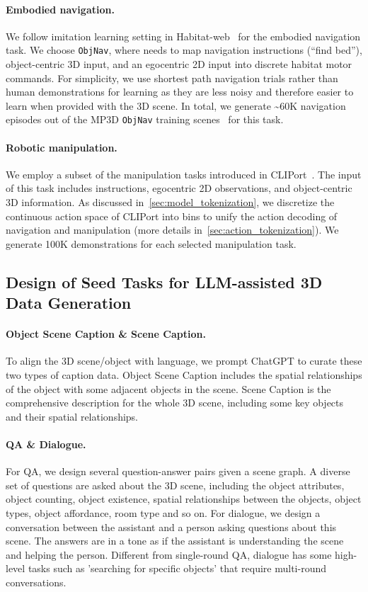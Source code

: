 \paragraph{Embodied navigation.} We follow imitation learning setting in Habitat-web~\citep{ramrakhya2022habitat} for the embodied navigation task. We choose \texttt{ObjNav}, where \agent needs to map navigation instructions (\eg ``find bed''), object-centric 3D input, and an egocentric 2D input into discrete habitat motor commands. For simplicity, we use shortest path navigation trials rather than human demonstrations for learning as they are less noisy and therefore easier to learn when provided with the 3D scene. In total, we generate \textasciitilde{}60K navigation episodes out of the MP3D \texttt{ObjNav} training scenes~\citep{savva2019habitat} for this task.

\paragraph{Robotic manipulation.} We employ a subset of the manipulation tasks introduced in CLIPort~\citep{cliport}. The input of this task includes instructions, egocentric 2D observations, and object-centric 3D information. As discussed in~\cref{sec:model_tokenization}, we discretize the continuous action space of CLIPort into bins to unify the action decoding of navigation and manipulation (more details in~\cref{sec:action_tokenization}). We generate 100K demonstrations for each selected manipulation task. 

\subsection{Design of Seed Tasks for LLM-assisted 3D Data Generation}\label{app:dataset:seed_task}

\paragraph{Object Scene Caption \& Scene Caption.} To align the 3D scene/object with language, we prompt ChatGPT to curate these two types of caption data. Object Scene Caption includes the spatial relationships of the object with some adjacent objects in the scene. Scene Caption is the comprehensive description for the whole 3D scene, including some key objects and their spatial relationships.

\paragraph{QA \& Dialogue.} For QA, we design several question-answer pairs given a scene graph. A diverse set of questions are asked about the 3D scene, including the object attributes, object counting, object existence, spatial relationships between the objects, object types, object affordance, room type and so on. For dialogue, we design a conversation between the assistant and a person asking questions about this scene. The answers are in a tone as if the assistant is understanding the scene and helping the person. Different from single-round QA, dialogue has some high-level tasks such as 'searching for specific objects' that require multi-round conversations.

